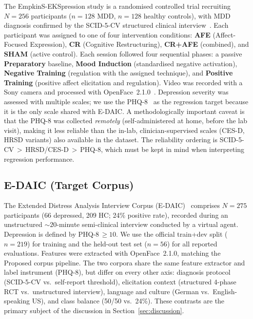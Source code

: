\documentclass[sigconf]{acmart}
\begin{document}
The EmpkinS-EKSpression study is a randomised controlled trial recruiting $N = 256$
participants ($n = 128$ MDD, $n = 128$ healthy controls), with MDD diagnosis confirmed
by the SCID-5-CV structured clinical interview~\cite{empkins_journal,anon2024protocol}.
Each participant was assigned to one of four intervention conditions: \textbf{AFE}
(Affect-Focused Expression), \textbf{CR} (Cognitive Restructuring), \textbf{CR+AFE}
(combined), and \textbf{SHAM} (active control).
Each session followed four sequential phases: a passive \textbf{Preparatory} baseline,
\textbf{Mood Induction} (standardised negative activation), \textbf{Negative Training}
(regulation with the assigned technique), and \textbf{Positive Training} (positive affect
elicitation and regulation). Video was recorded with a Sony camera and processed with
OpenFace~2.1.0~\cite{baltrusaitis2018openface}.
Depression severity was assessed with multiple scales; we use the
PHQ-8~\cite{kroenke2009phq8} as the regression target because it is the only scale
shared with E-DAIC. A methodologically important caveat is that the PHQ-8 was collected
\emph{remotely} (self-administered at home, before the lab visit), making it less
reliable than the in-lab, clinician-supervised scales (CES-D, HRSD variants) also
available in the dataset. The reliability ordering is SCID-5-CV\,$>$\,HRSD/CES-D\,$>$\,PHQ-8,
which must be kept in mind when interpreting regression performance.

\subsection{E-DAIC (Target Corpus)}
\label{sec:edaic}

The Extended Distress Analysis Interview Corpus (E-DAIC)~\cite{gratch2014edaic} comprises
$N = 275$ participants (66 depressed, 209 HC; 24\% positive rate), recorded during an
unstructured ${\sim}20$-minute semi-clinical interview conducted by a virtual agent.
Depression is defined by PHQ-8\,$\geq 10$. We use the official train+dev split ($n=219$)
for training and the held-out test set ($n=56$) for all reported evaluations.
Features were extracted with OpenFace~2.1.0, matching the Proposed corpus pipeline.
The two corpora share the same feature extractor and label instrument (PHQ-8), but differ
on every other axis: diagnosis protocol (SCID-5-CV vs.\ self-report threshold),
elicitation context (structured 4-phase RCT vs.\ unstructured interview),
language and culture (German vs.\ English-speaking US), and class balance (50/50 vs.\ 24\%).
These contrasts are the primary subject of the discussion in Section~\ref{sec:discussion}.
\end{document}
